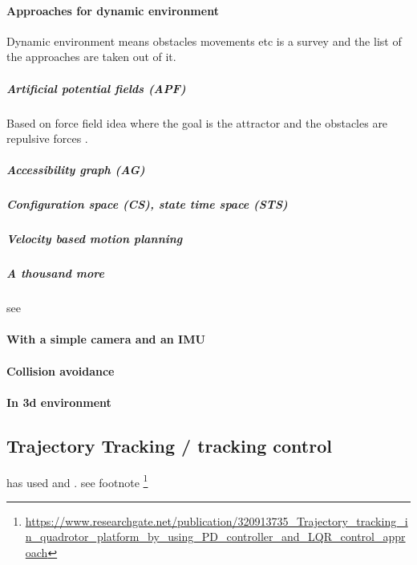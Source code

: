 \documentclass{article}
\begin{document}
		\paragraph{Approaches for dynamic environment}
			Dynamic environment means obstacles movements etc
			\cite{mohanan-2018-a-survey-of-robotic-motion-planning-in-dynamic-environments} is a survey and the list of the approaches are taken out of it.
			\cite{masehian-2007-robot-motion-planning-in-dynamic-environments-with-moving-obstacles-and-target}
			\subparagraph{Artificial potential fields (APF)}
			Based on force field idea where the goal is the attractor and the obstacles are repulsive forces \cite{mohanan-2018-a-survey-of-robotic-motion-planning-in-dynamic-environments,baydoun-2019-prediction-of-multi-target-dynamics-using-discrete-descriptors-an-interactive-approach}.  
			\subparagraph{Accessibility graph (AG)}
			\subparagraph{Configuration space (CS), state time space (STS)}
			\subparagraph{Velocity based motion planning}
			\subparagraph{A thousand more}
			see \cite{mohanan-2018-a-survey-of-robotic-motion-planning-in-dynamic-environments}
		\paragraph{With a simple camera and an IMU}
			\cite{loianno-2017-estimation-control-and-planning-for-aggressive-flight-with-a-small-quadrotor-with-a-single-camera-and-imu}
		
		\paragraph{Collision avoidance}
		\paragraph{In 3d environment}
		\cite{wang-2015-three-dimensional-path-planning-for-unmanned-aerial-vehicle-based-on-interfered-fluid-dynamical-system}
		\subsection{Trajectory Tracking / tracking control}
			\cite{tagliabue-2017-robust-collaborative-object-transportation-using-multiple-mavs} has used \cite{kamel-2016-linear-vs-nonlinear-mpc-for-trajectory-tracking-applied-to-rotary-wing-micro-aerial-vehicles} and \cite{kamel-2017-model-predictive-control-for-trajectory-tracking-of-unmanned-aerial-vehicles-using-robot-operating-system}.
			see footnote \footnote{\url{https://www.researchgate.net/publication/320913735_Trajectory_tracking_in_quadrotor_platform_by_using_PD_controller_and_LQR_control_approach}}
			
\end{document}
